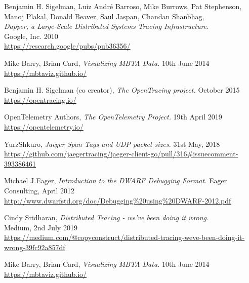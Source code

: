 \documentclass[12pt,pdftex,titlepage]{report}
\begin{document}
    \begin{thebibliography}{69}

        Benjamin H. Sigelman, Luiz André Barroso, Mike Burrows, Pat Stephenson, Manoj Plakal, Donald Beaver, Saul Jaspan, Chandan Shanbhag, \\
        \textit{Dapper, a Large-Scale Distributed Systems Tracing Infrastructure.} \\
        Google, Inc. 2010 \\
        \url{https://research.google/pubs/pub36356/}

        Mike Barry, Brian Card, \textit{Visualizing MBTA Data.}
        10th June 2014 \\
        \url{https://mbtaviz.github.io/}

        Benjamin H. Sigelman (co creator), \textit{The OpenTracing project.}
        October 2015 \\
        \url{https://opentracing.io/}

        OpenTelemetry Authors, \textit{The OpenTelemetry Project.} 
        19th April 2019 \\
        \url{https://opentelemetry.io/}

        YurzShkuro, \textit{Jaeger Span Tags and UDP packet sizes.}
        31st May, 2018 \\
        \url{https://github.com/jaegertracing/jaeger-client-go/pull/316#issuecomment-393386461}

        Michael J.Eager, \textit{Introduction to the DWARF Debugging Format.}
        Eager Consulting, April 2012 \\
        \url{http://www.dwarfstd.org/doc/Debugging%20using%20DWARF-2012.pdf}

        Cindy Sridharan, \textit{Distributed Tracing - we've been doing it wrong.} \\
        Medium, 2nd July 2019 \\
        \url{https://medium.com/@copyconstruct/distributed-tracing-weve-been-doing-it-wrong-39fc92a857df}

        Mike Barry, Brian Card, \textit{Visualizing MBTA Data.}
        10th June 2014 \\
        \url{https://mbtaviz.github.io/}
    \end{thebibliography}
\end{document}
